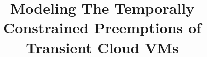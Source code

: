 \documentclass[sigconf, review, anonymous]{acmart} %
\begin{document}
\title{Modeling The Temporally Constrained Preemptions of Transient Cloud VMs}

\author{}{}{}

\begin{abstract}
  
\end{abstract}

\maketitle





%





%

%












{


%
}
\end{document}

